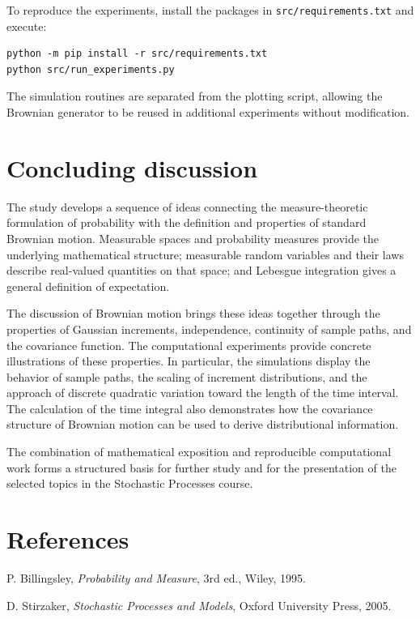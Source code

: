 \documentclass[11pt,a4paper,oneside]{article}
\begin{document}
To reproduce the experiments, install the packages in \texttt{src/requirements.txt} and execute:
\begin{lstlisting}[style=python]
python -m pip install -r src/requirements.txt
python src/run_experiments.py
\end{lstlisting}
The simulation routines are separated from the plotting script, allowing the Brownian generator to be reused in additional experiments without modification.

\section{Concluding discussion}
The study develops a sequence of ideas connecting the measure-theoretic formulation of probability with the definition and properties of standard Brownian motion. Measurable spaces and probability measures provide the underlying mathematical structure; measurable random variables and their laws describe real-valued quantities on that space; and Lebesgue integration gives a general definition of expectation.

The discussion of Brownian motion brings these ideas together through the properties of Gaussian increments, independence, continuity of sample paths, and the covariance function. The computational experiments provide concrete illustrations of these properties. In particular, the simulations display the behavior of sample paths, the scaling of increment distributions, and the approach of discrete quadratic variation toward the length of the time interval. The calculation of the time integral also demonstrates how the covariance structure of Brownian motion can be used to derive distributional information.

The combination of mathematical exposition and reproducible computational work forms a structured basis for further study and for the presentation of the selected topics in the Stochastic Processes course.

\section*{References}
{\small\setlength{\parskip}{1pt}
\begin{enumerate}[label={[\arabic*]},leftmargin=1.5em,itemsep=1pt,topsep=2pt]
 \item P. Billingsley, \emph{Probability and Measure}, 3rd ed., Wiley, 1995.
 \item D. Stirzaker, \emph{Stochastic Processes and Models}, Oxford University Press, 2005.

\end{enumerate}}
\end{document}
